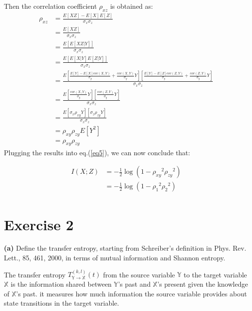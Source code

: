 \documentclass[11pt]{article}
\makeatletter
\newenvironment{proofw}{\par
	\pushQED{\qed}%
	\normalfont \topsep6\p@\@plus6\p@\relax
	\trivlist
	\item[]\ignorespaces
}{%
	\popQED\endtrivlist\@endpefalse
}
\makeatother
\begin{document}
\begin{proofw}
\pagebreak
Then the correlation coefficient $\rho_{xz}$ is obtained as:
\begin{equation*}\label{eq4}
\begin{split}
\rho_{xz} & = \frac{E[XZ]-E[X]E[Z]}{\sigma_{x}\sigma_{z}}\\
		  & =\frac{E[XZ]}{\sigma_{x}\sigma_{z}}\\
		  & =\frac{E[E[XZ|Y]]}{\sigma_{x}\sigma_{z}}\\
		  & =\frac{E [E[X|Y] E[Z|Y]]}{\sigma_{x}\sigma_{z} }\\
		  & =\frac{E[\frac{E[Y]-E[X]cov(X,Y)}{\sigma_{y}} + \frac{cov(X,Y)}{\sigma_{y}}Y][\frac{E[Y]-E[Z]cov(Z,Y)}{\sigma_{y}}+ \frac{cov (Z,Y)}{\sigma_{y}}Y] } {\sigma_{x}\sigma_{z}}\\
		  & =\frac{E[ \frac{cov(X,Y)}{\sigma_{y}}Y][\frac{cov (Z,Y)}{\sigma_{y}}Y]} {\sigma_{x}\sigma_{z}}\\
		  &=\frac{E[\sigma_{x}\rho_{xy}Y][\sigma_{z}\rho_{zy}Y]}{\sigma_{x}\sigma_{z}}\\
		  &=\rho_{xy}\rho_{zy}E[{Y}^{2}]\\
		  &=\rho_{xy}\rho_{zy}
\end{split}
\end{equation*}
Plugging the results into eq.(\ref{eq5}), we can now conclude that:

\begin{equation*}
\begin{split}
I(X;Z) & =  -\frac{1}{2}\log	(1 - {\rho_{xy}}^2{\rho_{zy}}^2)\\
	& =  -\frac{1}{2}\log	(1 - {\rho_{1}}^2{\rho_{2}}^2)\\
\end{split}
\end{equation*}
\end{proofw}
\pagebreak

\section{Exercise 2}
\begin{tcolorbox}
\textbf{(a)}
Define the transfer entropy, starting from Schreiber’s definition in
Phys. Rev. Lett., 85, 461, 2000, in terms of mutual information and Shannon
entropy.
\end{tcolorbox}

The transfer entropy ${T}^{(k,l)}_{\mathbb{Y}\rightarrow \mathbb{X}}(t)$ from the source variable $\mathbb{Y}$ to the target variable $\mathbb{X}$ is the information shared between $\mathbb{Y}$'s past and $\mathbb{X}$'s present given the knowledge of $\mathbb{X}$'s past. it measures how much information the source variable provides about state transitions in the target variable. \\
\end{document}
